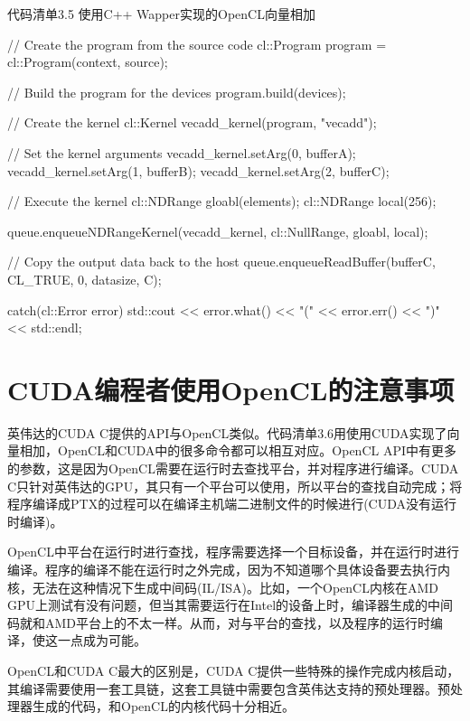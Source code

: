 \begin{codeboxt}[cpp]{代码清单3.5 使用C++ Wapper实现的OpenCL向量相加}
{{    // Create the program from the source code
    cl::Program program = cl::Program(context, source);

    // Build the program for the devices
    program.build(devices);

    // Create the kernel
    cl::Kernel vecadd_kernel(program, "vecadd");

    // Set the kernel arguments
    vecadd_kernel.setArg(0, bufferA);
    vecadd_kernel.setArg(1, bufferB);
    vecadd_kernel.setArg(2, bufferC);

    // Execute the kernel
    cl::NDRange gloabl(elements);
    cl::NDRange local(256);

    queue.enqueueNDRangeKernel(vecadd_kernel, cl::NullRange, gloabl, local);

    // Copy the output data back to the host
    queue.enqueueReadBuffer(bufferC, CL_TRUE, 0, datasize, C);
  } catch(cl::Error error){
    std::cout << error.what() << "(" << error.err() << ")" << std::endl;
  }
}
\end{codeboxt}



\section{CUDA编程者使用OpenCL的注意事项}

英伟达的CUDA C提供的API与OpenCL类似。代码清单3.6用使用CUDA实现了向量相加，OpenCL和CUDA中的很多命令都可以相互对应。OpenCL API中有更多的参数，这是因为OpenCL需要在运行时去查找平台，并对程序进行编译。CUDA C只针对英伟达的GPU，其只有一个平台可以使用，所以平台的查找自动完成；将程序编译成PTX的过程可以在编译主机端二进制文件的时候进行(CUDA没有运行时编译)。

OpenCL中平台在运行时进行查找，程序需要选择一个目标设备，并在运行时进行编译。程序的编译不能在运行时之外完成，因为不知道哪个具体设备要去执行内核，无法在这种情况下生成中间码(IL/ISA)。比如，一个OpenCL内核在AMD GPU上测试有没有问题，但当其需要运行在Intel的设备上时，编译器生成的中间码就和AMD平台上的不太一样。从而，对与平台的查找，以及程序的运行时编译，使这一点成为可能。

OpenCL和CUDA C最大的区别是，CUDA C提供一些特殊的操作完成内核启动，其编译需要使用一套工具链，这套工具链中需要包含英伟达支持的预处理器。预处理器生成的代码，和OpenCL的内核代码十分相近。

